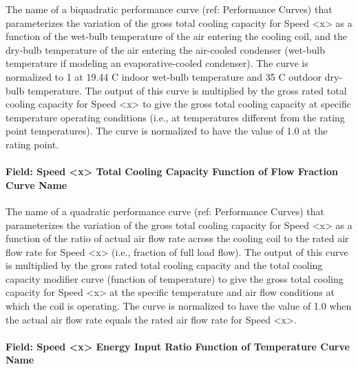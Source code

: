 The name of a biquadratic performance curve (ref: Performance Curves) that parameterizes the variation of the gross total cooling capacity for Speed \textless{}x\textgreater{} as a function of the wet-bulb temperature of the air entering the cooling coil, and the dry-bulb temperature of the air entering the air-cooled condenser (wet-bulb temperature if modeling an evaporative-cooled condenser). The curve is normalized to 1 at 19.44 C indoor wet-bulb temperature and 35 C outdoor dry-bulb temperature. The output of this curve is multiplied by the gross rated total cooling capacity for Speed \textless{}x\textgreater{} to give the gross total cooling capacity at specific temperature operating conditions (i.e., at temperatures different from the rating point temperatures). The curve is normalized to have the value of 1.0 at the rating point.

\paragraph{Field: Speed \textless{}x\textgreater{} Total Cooling Capacity Function of Flow Fraction Curve Name}\label{field-speed-x-total-cooling-capacity-function-of-flow-fraction-curve-name}

The name of a quadratic performance curve (ref: Performance Curves) that parameterizes the variation of the gross total cooling capacity for Speed \textless{}x\textgreater{} as a function of the ratio of actual air flow rate across the cooling coil to the rated air flow rate for Speed \textless{}x\textgreater{} (i.e., fraction of full load flow). The output of this curve is multiplied by the gross rated total cooling capacity and the total cooling capacity modifier curve (function of temperature) to give the gross total cooling capacity for Speed \textless{}x\textgreater{} at the specific temperature and air flow conditions at which the coil is operating. The curve is normalized to have the value of 1.0 when the actual air flow rate equals the rated air flow rate for Speed \textless{}x\textgreater{}.

\paragraph{Field: Speed \textless{}x\textgreater{} Energy Input Ratio Function of Temperature Curve Name}\label{field-speed-x-energy-input-ratio-function-of-temperature-curve-name}

